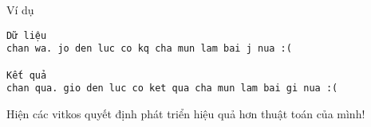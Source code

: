 Ví dụ
\begin{verbatim}
Dữ liệu
chan wa. jo den luc co kq cha mun lam bai j nua :(

Kết quả 
chan qua. gio den luc co ket qua cha mun lam bai gi nua :(
\end{verbatim}

   Hiện các vitkos quyết định phát triển hiệu quả hơn thuật toán của mình!